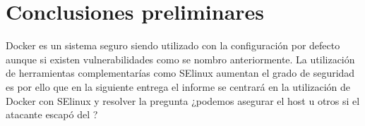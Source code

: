 \documentclass[letter,10pt]{article}
\begin{document}
\section{Conclusiones preliminares}
Docker es un sistema seguro siendo utilizado con la configuración por defecto aunque si existen vulnerabilidades como se nombro anteriormente. La utilización de herramientas complementarías como SElinux aumentan el grado de seguridad es por ello que en la siguiente entrega el informe se centrará en la utilización de Docker con SElinux y resolver la pregunta ¿podemos asegurar el host u otros \containers si el atacante escapó del \container?




\end{document}
